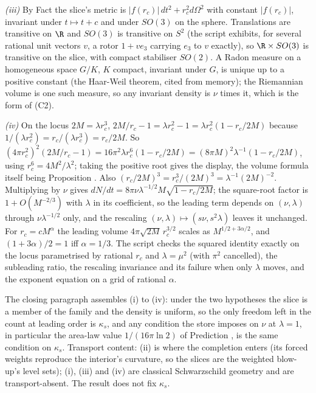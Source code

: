 \emph{(iii)} By Fact  the slice's metric is $|f(r_c)|\,dt^{2} + r_c^{2}d\Omega^{2}$ with constant $|f(r_c)|$, invariant under $t \mapsto t + c$ and under $SO(3)$ on the sphere. Translations are transitive on $\R$ and $SO(3)$ is transitive on $S^{2}$ (the script exhibits, for several rational unit vectors $v$, a rotor $1 + ve_3$ carrying $e_3$ to $v$ exactly), so $\R \times SO(3)$ is transitive on the slice, with compact stabiliser $SO(2)$. A Radon measure on a homogeneous space $G/K$, $K$ compact, invariant under $G$, is unique up to a positive constant (the Haar-Weil theorem, cited from memory); the Riemannian volume is one such measure, so any invariant density is $\nu$ times it, which is the form of (C2).

\emph{(iv)} On the locus $2M = \lambda r_c^{3}$, $2M/r_c - 1 = \lambda r_c^{2} - 1 = \lambda r_c^{2}(1 - r_c/2M)$ because $1/(\lambda r_c^{2}) = r_c/(\lambda r_c^{3}) = r_c/2M$. So $(4\pi r_c^{2})^{2}(2M/r_c - 1) = 16\pi^{2}\lambda r_c^{6}(1 - r_c/2M) = (8\pi M)^{2}\lambda^{-1}(1 - r_c/2M)$, using $r_c^{6} = 4M^{2}/\lambda^{2}$; taking the positive root gives the display, the volume formula itself being Proposition . Also $(r_c/2M)^{3} = r_c^{3}/(2M)^{3} = \lambda^{-1}(2M)^{-2}$. Multiplying by $\nu$ gives $dN/dt = 8\pi\nu\lambda^{-1/2}M\sqrt{1 - r_c/2M}$; the square-root factor is $1 + O(M^{-2/3})$ with $\lambda$ in its coefficient, so the leading term depends on $(\nu, \lambda)$ through $\nu\lambda^{-1/2}$ only, and the rescaling $(\nu, \lambda) \mapsto (s\nu, s^{2}\lambda)$ leaves it unchanged. For $r_c = cM^{\alpha}$ the leading volume $4\pi\sqrt{2M}\,r_c^{3/2}$ scales as $M^{1/2 + 3\alpha/2}$, and $(1 + 3\alpha)/2 = 1$ iff $\alpha = 1/3$. The script checks the squared identity exactly on the locus parametrised by rational $r_c$ and $\lambda = \mu^{2}$ (with $\pi^{2}$ cancelled), the subleading ratio, the rescaling invariance and its failure when only $\lambda$ moves, and the exponent equation on a grid of rational $\alpha$.

The closing paragraph assembles (i) to (iv): under the two hypotheses the slice is a member of the family and the density is uniform, so the only freedom left in the count at leading order is $\kappa_s$, and any condition the store imposes on $\nu$ at $\lambda = 1$, in particular the area-law value $1/(16\pi\ln 2)$ of Prediction , is the same condition on $\kappa_s$. Transport content: (ii) is where the completion enters (its forced weights reproduce the interior's curvature, so the slices are the weighted blow-up's level sets); (i), (iii) and (iv) are classical Schwarzschild geometry and are transport-absent. The result does not fix $\kappa_s$.
